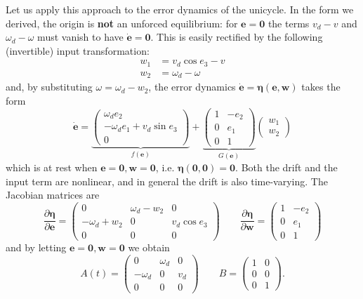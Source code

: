 \documentclass[10pt, a4paper]{report}
\begin{document}
Let us apply this approach to the error dynamics of the unicycle. In the form we derived, the origin is \textbf{not} an unforced equilibrium: for $\mathbf e=\mathbf 0$ the terms $v_d-v$ and $\omega_d-\omega$ must vanish to have $\dot{\mathbf e}=\mathbf 0$. This is easily rectified by the following (invertible) input transformation:\begin{align}
    w_1&=v_d\cos e_3-v\\
    w_2&=\omega_d-\omega
\end{align}
and, by substituting $\omega=\omega_d-w_2$, the error dynamics $\dot{\mathbf e}=\boldsymbol\eta(\mathbf e,\mathbf w)$ takes the form\begin{equation}
    \dot{\mathbf e}=\underbrace{\begin{pmatrix}
        \omega_d e_2\\ -\omega_d e_1+v_d\sin e_3\\ 0
    \end{pmatrix}}_{f(\mathbf e)}+\underbrace{\begin{pmatrix}
        1&-e_2\\ 0&e_1\\ 0&1
    \end{pmatrix}}_{G(\mathbf e)}\begin{pmatrix}
        w_1\\ w_2
    \end{pmatrix}
\end{equation}
which is at rest when $\mathbf e=\mathbf 0,\mathbf w=\mathbf 0$, i.e. $\boldsymbol\eta(\mathbf 0,\mathbf 0)=\mathbf 0$. Both the drift and the input term are nonlinear, and in general the drift is also time-varying. The Jacobian matrices are\begin{equation}
    \frac{\partial\boldsymbol\eta}{\partial\mathbf e}=\begin{pmatrix}
        0&\omega_d-w_2&0\\
        -\omega_d+w_2&0&v_d\cos e_3\\
        0&0&0
    \end{pmatrix}\qquad
    \frac{\partial\boldsymbol\eta}{\partial\mathbf w}=\begin{pmatrix}
        1&-e_2\\0&e_1\\0&1
    \end{pmatrix}
\end{equation}
and by letting $\mathbf e=\mathbf 0,\mathbf w=\mathbf 0$ we obtain\begin{equation}
    A(t)=\begin{pmatrix}
        0&\omega_d&0\\-\omega_d&0&v_d\\0&0&0
    \end{pmatrix}\qquad B=\begin{pmatrix}
        1&0\\0&0\\0&1
    \end{pmatrix}.
\end{equation}
\end{document}

